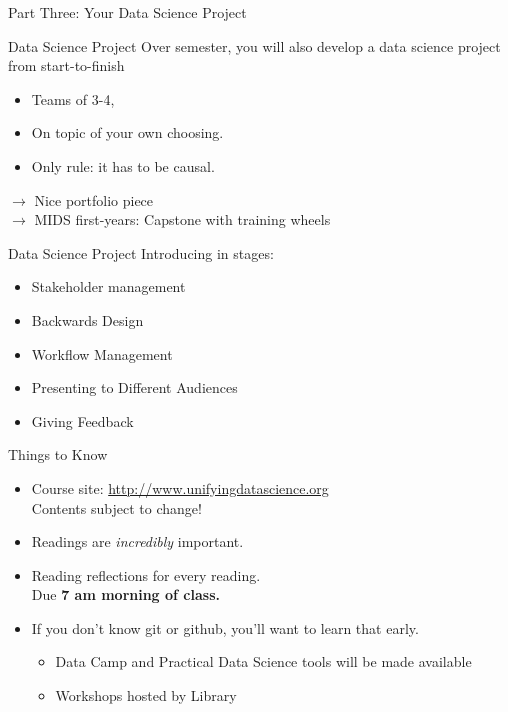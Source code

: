 \documentclass[11pt]{beamer}
\begin{document}
\begin{frame}[c]
  \centering
  Part Three: Your Data Science Project
\end{frame}

\begin{frame}[c]{Data Science Project}
Over semester, you will also develop a data science project from start-to-finish
\begin{itemize}
  \item Teams of 3-4,
  \item On topic of your own choosing.
  \item Only rule: it has to be causal.
\end{itemize}
\pause $\rightarrow$ Nice portfolio piece\\
\pause $\rightarrow$ MIDS first-years: Capstone with training wheels
\end{frame}


\begin{frame}[c]{Data Science Project}
  Introducing in stages:
  \begin{itemize}
    \pause \item Stakeholder management 
    \pause \item Backwards Design
    \pause \item Workflow Management 
    \pause \item Presenting to Different Audiences 
    \pause \item Giving Feedback
  \end{itemize}
\end{frame}
  


\begin{frame}[c]{Things to Know}
\begin{itemize}
\item Course site: \url{http://www.unifyingdatascience.org} \\
\alert{Contents subject to change!}
\pause \item Readings are \emph{incredibly} important. \\
\pause \item Reading reflections for every reading. \\
Due \textbf{7 am morning of class.} \\
\pause \item If you don't know git or github, you'll want to learn that early.
\begin{itemize}
\item Data Camp and Practical Data Science tools will be made available
\item Workshops hosted by Library
\end{itemize}
\end{itemize}
\end{frame}
\end{document}
